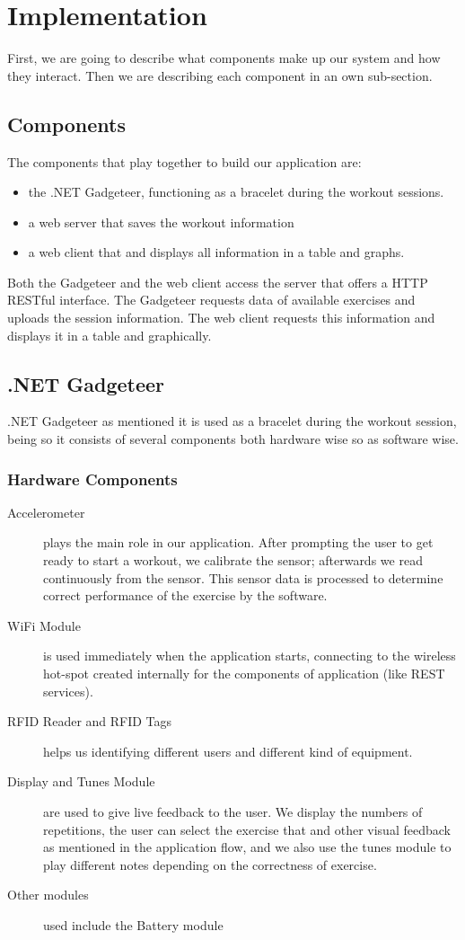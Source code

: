 \documentclass{tk3-team}
\begin{document}
\section{Implementation}

First, we are going to describe what components make up our system and how they interact. Then we are describing each component in an own sub-section.

\subsection{Components}
The components that play together to build our application are:
\begin{itemize}
	\item the .NET Gadgeteer, functioning as a bracelet during the workout sessions.
	\item a web server that saves the workout information 
	\item  a web client that and displays all information in a table and graphs.
\end{itemize}

Both the Gadgeteer and the web client access the server that offers a HTTP RESTful interface. The Gadgeteer requests data of available exercises  and uploads the session information. The web client requests this information and displays it in a table and graphically.

\subsection{.NET Gadgeteer}
.NET Gadgeteer as mentioned it is used as a bracelet during the workout session, being so it consists of several components both hardware wise so as software wise. 

\subsubsection{Hardware Components}

\begin{description}
\item[Accelerometer] plays the main role in our application. After prompting the user to get ready to start a workout, we calibrate the sensor; afterwards we read continuously from the sensor. This sensor data is processed to determine correct performance of the exercise by the software.
\item[WiFi Module] is used immediately when the application starts, connecting to the wireless hot-spot created internally for the components of application (like REST services). 
\item[RFID Reader and RFID Tags] helps us identifying different users and different kind of equipment.
\item[Display and Tunes Module] are used to give live feedback to the user. We display the numbers of repetitions, the user can select the exercise that and other visual feedback as mentioned in the application flow, and we also use the tunes module to play different notes depending on the correctness of exercise. 
\item[Other modules] used include the Battery module
\end{description}
\end{document}
